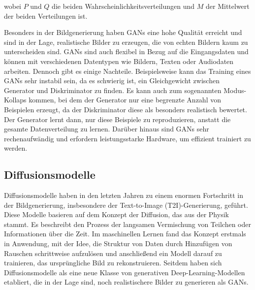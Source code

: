 wobei $P$ und $Q$ die beiden Wahrscheinlichkeitsverteilungen und $M$ der Mittelwert der beiden Verteilungen ist.

Besonders in der Bildgenerierung haben GANs eine hohe Qualität erreicht und sind in der Lage, realistische Bilder zu erzeugen, die von echten Bildern kaum zu unterscheiden sind. GANs sind auch flexibel in Bezug auf die Eingangsdaten und können mit verschiedenen Datentypen wie Bildern, Texten oder Audiodaten arbeiten. Dennoch gibt es einige Nachteile. Beispielsweise kann das Training eines GANs sehr instabil sein, da es schwierig ist, ein Gleichgewicht zwischen Generator und Diskriminator zu finden. Es kann auch zum sogenannten Modus-Kollaps kommen, bei dem der Generator nur eine begrenzte Anzahl von Beispielen erzeugt, da der Diskriminator diese als besonders realistisch bewertet. Der Generator lernt dann, nur diese Beispiele zu reproduzieren, anstatt die gesamte Datenverteilung zu lernen. Darüber hinaus sind GANs sehr rechenaufwändig und erfordern leistungsstarke Hardware, um effizient trainiert zu werden.

\subsection{Diffusionsmodelle} \label{subsec:diffusion-models}

Diffusionsmodelle haben in den letzten Jahren zu einem enormen Fortschritt in der Bildgenerierung, insbesondere der Text-to-Image (T2I)-Generierung, geführt. Diese Modelle basieren auf dem Konzept der Diffusion, das aus der Physik stammt. Es beschreibt den Prozess der langsamen Vermischung von Teilchen oder Informationen über die Zeit. Im maschinellen Lernen fand das Konzept erstmals in \parencite{SohlDickstein2015diffusionmodels} Anwendung, mit der Idee, die Struktur von Daten durch Hinzufügen von Rauschen schrittweise aufzulösen und anschließend ein Modell darauf zu trainieren, das ursprüngliche Bild zu rekonstruieren. Seitdem haben sich Diffusionsmodelle als eine neue Klasse von generativen Deep-Learning-Modellen etabliert, die in der Lage sind, noch realistischere Bilder zu generieren als GANs.

